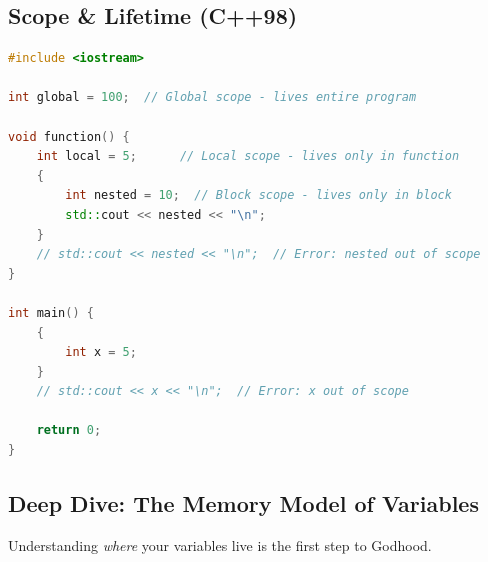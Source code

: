 \hypertarget{scope-lifetime-c98}{%
\subsection{Scope \& Lifetime (C++98)}\label{scope-lifetime-c98}}

\begin{lstlisting}[language={C++}]
#include <iostream>

int global = 100;  // Global scope - lives entire program

void function() {
    int local = 5;      // Local scope - lives only in function
    {
        int nested = 10;  // Block scope - lives only in block
        std::cout << nested << "\n";
    }
    // std::cout << nested << "\n";  // Error: nested out of scope
}

int main() {
    {
        int x = 5;
    }
    // std::cout << x << "\n";  // Error: x out of scope
    
    return 0;
}
\end{lstlisting}

\hypertarget{deep-dive-the-memory-model-of-variables}{%
\subsection{Deep Dive: The Memory Model of
Variables}\label{deep-dive-the-memory-model-of-variables}}

Understanding \emph{where} your variables live is the first step to
Godhood.

